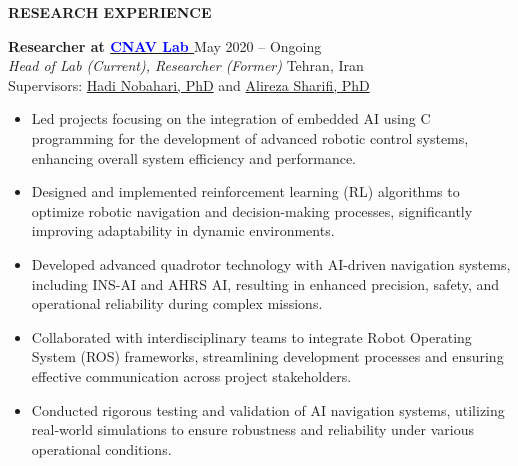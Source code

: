 \documentclass[12pt]{article}
\begin{document}
\vspace{0.2in} %


\begin{center}
	{\noindent \bfseries RESEARCH EXPERIENCE} %
\end{center} 

\vspace{8pt} %

\noindent
{\bfseries Researcher at
\href{https://www.linkedin.com/company/cnav-lab/}{\textcolor{blue}{CNAV Lab \faLinkedin}} \href{https://github.com/CNAVLAB}{\faGithub}
\textcolor{red}{
\href{https://youtube.com/@cnavlab?si=Fc-Y3oyKdgAmz3-5}{\faYoutube}}
} \hfill May 2020 -- Ongoing \\ 
\noindent \textit{Head of Lab (Current), Researcher (Former) }
\hfill Tehran, Iran \\ 
\noindent Supervisors: 
\href{https://ae.sharif.edu/~portal/faculty/1091235256}{Hadi Nobahari, PhD} and
\href{https://ae.sharif.edu/~portal/faculty/1730782165}{Alireza Sharifi, PhD}

\begin{itemize} \itemsep -4pt %
    \item Led projects focusing on the integration of embedded AI using C programming for the development of advanced robotic control systems, enhancing overall system efficiency and performance.
    \item Designed and implemented reinforcement learning (RL) algorithms to optimize robotic navigation and decision-making processes, significantly improving adaptability in dynamic environments.
    \item Developed advanced quadrotor technology with AI-driven navigation systems, including INS-AI and AHRS AI, resulting in enhanced precision, safety, and operational reliability during complex missions.
    \item Collaborated with interdisciplinary teams to integrate Robot Operating System (ROS) frameworks, streamlining development processes and ensuring effective communication across project stakeholders.
    \item Conducted rigorous testing and validation of AI navigation systems, utilizing real-world simulations to ensure robustness and reliability under various operational conditions.
\end{itemize}
\end{document}
